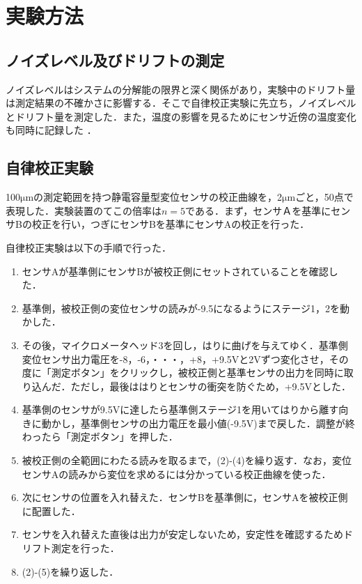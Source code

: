 \section{実験方法}

\subsection{ノイズレベル及びドリフトの測定}
ノイズレベルはシステムの分解能の限界と深く関係があり，実験中のドリフト量は測定結果の不確かさに影響する．そこで自律校正実験に先立ち，ノイズレベルとドリフト量を測定した．また，温度の影響を見るためにセンサ近傍の温度変化も同時に記録した
．

\subsection{自律校正実験}
100$\mathrm{\mu m}$の測定範囲を持つ静電容量型変位センサの校正曲線を，2$\mathrm{\mu m}$ごと，50点で表現した．実験装置のてこの倍率は$n = 5$である．まず，センサＡを基準にセンサBの校正を行い，つぎにセンサBを基準にセンサAの校正を行った．

自律校正実験は以下の手順で行った．
\begin{enumerate}
    \item センサAが基準側にセンサBが被校正側にセットされていることを確認した．
    \item 基準側，被校正側の変位センサの読みが-9.5になるようにステージ1，2を動かした．
    \item その後，マイクロメータヘッド3を回し，はりに曲げを与えてゆく．基準側変位センサ出力電圧を-8，-6，・・・，+8，+9.5Vと2Vずつ変化させ，その度に「測定ボタン」をクリックし，被校正側と基準センサの出力を同時に取り込んだ．ただし，最後ははりとセンサの衝突を防ぐため，+9.5Vとした．
    \item 基準側のセンサが9.5Vに達したら基準側ステージ1を用いてはりから離す向きに動かし，基準側センサの出力電圧を最小値(-9.5V)まで戻した．調整が終わったら「測定ボタン」を押した．
    \item 被校正側の全範囲にわたる読みを取るまで，(2)-(4)を繰り返す．なお，変位センサAの読みから変位を求めるには分かっている校正曲線を使った．
    \item 次にセンサの位置を入れ替えた．センサBを基準側に，センサAを被校正側に配置した．
    \item センサを入れ替えた直後は出力が安定しないため，安定性を確認するためドリフト測定を行った．
    \item (2)-(5)を繰り返した．
\end{enumerate}